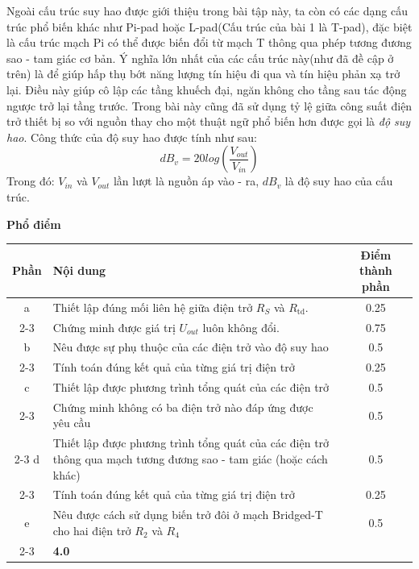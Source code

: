 Ngoài cấu trúc suy hao được giới thiệu trong bài tập này, ta còn có các dạng cấu trúc phổ biến khác như Pi-pad hoặc L-pad(Cấu trúc của bài 1 là T-pad), đặc biệt là cấu trúc mạch Pi có thể được biến đổi từ mạch T thông qua phép tương đương sao - tam giác cơ bản. Ý nghĩa lớn nhất của các cấu trúc này(như đã đề cập ở trên) là để giúp hấp thụ bớt năng lượng tín hiệu đi qua và tín hiệu phản xạ trở lại. Điều này giúp cô lập các tầng khuếch đại, ngăn không cho tầng sau tác động ngược trở lại tầng trước. Trong bài này cũng đã sử dụng tỷ lệ giữa công suất điện trở thiết bị so với nguồn thay cho một thuật ngữ phổ biến hơn được gọi là \emph{độ suy hao}. Công thức của độ suy hao được tính như sau: 
\begin{equation}
    dB_v = 20log(\frac{V_{out}}{V_{in}})
\end{equation}
Trong đó: $V_{in}$ và $V_{out}$ lần lượt là nguồn áp vào - ra, $dB_v$ là độ suy hao của cấu trúc.
\vspace{0.5cm}

\noindent \textbf{\large Phổ điểm}
\begin{center}
\renewcommand{\arraystretch}{1.5}
\begin{tabularx}{\textwidth}{|c|X|c|}
\hline
\textbf{Phần} & \textbf{Nội dung} & \textbf{Điểm thành phần} \\ \hline
a & Thiết lập đúng mối liên hệ giữa điện trở $R_S$ và $R_{\mathrm{td}}$. & 0.25 \\ \cline{2-3} 
 & Chứng minh được giá trị $U_{out}$ luôn không đổi. & 0.75 \\ \hline
b & Nêu được sự phụ thuộc của các điện trở vào độ suy hao & 0.5 \\ \cline{2-3} 
 & Tính toán đúng kết quả của từng giá trị điện trở & 0.25 \\ \hline
c & Thiết lập được phương trình tổng quát của các điện trở & 0.5 \\ \cline{2-3} 
 & Chứng minh không có ba điện trở nào đáp ứng được yêu cầu & 0.5 \\ \cline{2-3}  \hline
d & Thiết lập được phương trình tổng quát của các điện trở thông qua mạch tương đương sao - tam giác (hoặc cách khác) & 0.5 \\ \cline{2-3} 
 & Tính toán đúng kết quả của từng giá trị điện trở & 0.25 \\ \hline
e & Nêu được cách sử dụng biến trở đôi ở mạch Bridged-T cho hai điện trở $R_2$ và $R_4$ & 0.5 \\ \cline{2-3} 

\multicolumn{2}{|r|}{\textbf{Tổng điểm}} & \textbf{4.0} \\ \hline
\end{tabularx}
\end{center}